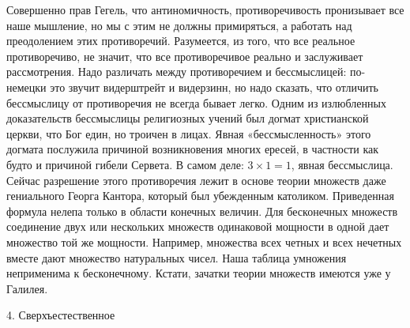 Совершенно прав Гегель, что антиномичность, противоречивость пронизывает все
наше мышление, но мы с этим не должны примиряться, а работать над преодолением
этих противоречий. Разумеется, из того, что все реальное противоречиво, не
значит, что все противоречивое реально и заслуживает рассмотрения. Надо
различать между противоречием и бессмыслицей: по-немецки это звучит видерштрейт
и видерзинн, но надо сказать, что отличить бессмыслицу от противоречия не
всегда бывает легко. Одним из излюбленных доказательств бессмыслицы религиозных
учений был догмат христианской церкви, что Бог един, но троичен в лицах. Явная
«бессмысленность» этого догмата послужила причиной возникновения многих ересей,
в частности как будто и причиной гибели Сервета. В самом деле: $3 \times 1 = 1$, явная
бессмыслица. Сейчас разрешение этого противоречия лежит в основе теории
множеств даже гениального Георга Кантора, который был убежденным католиком.
Приведенная формула нелепа только в области конечных величин. Для бесконечных
множеств соединение двух или нескольких множеств одинаковой мощности в одной
дает множество той же мощности. Например, множества всех четных и всех нечетных
вместе дают множество натуральных чисел. Наша таблица умножения неприменима к
бесконечному. Кстати, зачатки теории множеств имеются уже у Галилея.

4. Сверхъестественное

